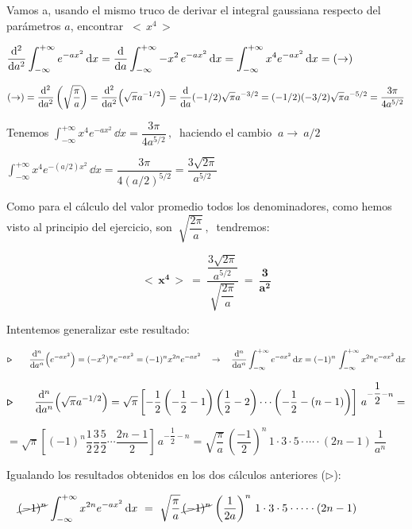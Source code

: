 \color{MidnightBlue}

Vamos a, usando el mismo truco de derivar el integral gaussiana respecto del parámetros $a$, encontrar $\ <\, x^{4} \, >$

$\displaystyle \dv[2]{a}  \int_{-\infty}^{+\infty} e^{-ax^2} \, \dd x = \dv{a}  \int_{-\infty}^{+\infty} - x^2 \, e^{-ax^2} \, \dd x =  \int_{-\infty}^{+\infty} x^4 e^{-ax^2}\, \dd x = (\to)$

$\displaystyle (\to)= \dv[2]{a} \left( \sqrt{\dfrac \pi a} \right) = \dv[2]{a} (\sqrt{\pi} a^{-1/2} ) = \dv{a} (-1/2) \sqrt{\pi} a^{-3/2} = (-1/2)(-3/2)\sqrt{\pi} a^{-5/2}=\dfrac {3\pi}{4a^{5/2}}$

Tenemos $ \displaystyle \int_{-\infty}^{+\infty} x^4 e^{-ax^2}\, \dd x = \dfrac {3\pi}{4a^{5/2}} \, , \ $ haciendo el cambio $\ a \to \ a/2 $

$ \displaystyle \int_{-\infty}^{+\infty} x^4 e^{-(a/2)x^2}\, \dd x = \dfrac {3\pi}{4(a/2)^{5/2}} = \dfrac {3\sqrt{2\pi}}{a^{5/2}}$

Como para el cálculo del valor promedio todos los denominadores, como hemos visto al principio del ejercicio,  son  $\ \sqrt{\dfrac{2\pi}{a}}\, , \ $ tendremos:

$$\boldsymbol {  <\, x^4\, > \ = }\ \dfrac{\dfrac {3\sqrt{2\pi}}{a^{5/2}}}{\sqrt{\dfrac{2\pi}{a}}}\ = \boldsymbol { \ \dfrac 3 {a^2} }$$

\vspace{5mm} Intentemos generalizar este resultado:

$\boldsymbol{ \triangleright } \qquad \displaystyle \dv[n]{a} (e^{-ax^2})=(-x^2)^n e^{-ax^2}=(-1)^n x^{2n} e^{-ax^2} \quad \to \quad \dv[n]{a} \int_{-\infty}^{+\infty}  e^{-ax^2} \, \dd x = (-1)^n \,\int_{-\infty}^{+\infty} x^{2n} e^{-ax^2}\, \dd x $


$\boldsymbol{ \triangleright } \qquad \displaystyle \dv[n]{a}(\sqrt{\pi}a^{-1/2})=\sqrt{\pi} \left[ -\dfrac 1 2 \left(-\dfrac 1 2 - 1 \right) \left(\dfrac 1 2 - 2 \right) \cdots \left( -\dfrac 1 2 -(n-1) \right) \right] \, a^{-\dfrac 1 2 - n}=$

$= \sqrt{\pi} \left[  (-1)^n \dfrac 1 2 \dfrac 3 2 \dfrac 5 2 \cdots \dfrac {2n-1}2 \right] \, a^{-\dfrac 1 2 - n} = \sqrt{\dfrac \pi a } \, \left( \dfrac {-1}{2} \right)^n\, 1\cdot 3 \cdot 5 \cdot \cdots \cdot (2n-1) \, \dfrac 1 {a^n} $

Igualando los resultados obtenidos en los dos cálculos anteriores ($\triangleright$):

$\quad \displaystyle \cancel{(-1)^n} \, \int_{-\infty}^{+\infty} x^{2n} e^{-ax^2}\, \dd x  \ = \  \sqrt{\dfrac \pi a } \, \cancel{(-1)^n} \, \left( \dfrac {1}{2a} \right)^n\, 1\cdot 3 \cdot 5 \cdot \cdots \cdot (2n-1) $

